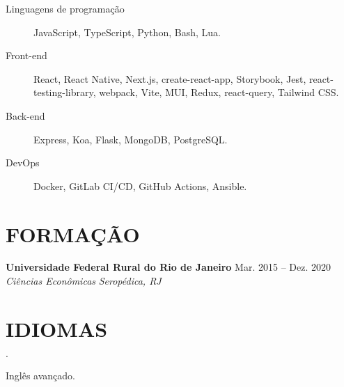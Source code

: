 \documentclass[12pt]{article}
\newenvironment{tightlist}
  {\begin{list}
    {$\cdot$}
    {
      \setlength{\leftmargin}{0em}
      \setlength{\itemsep}{\smallskipamount}
    }
  }
{\end{list}}
\begin{document}
\begin{description}
  \item[Linguagens de programação] JavaScript, TypeScript, Python, Bash, Lua.
  \item[Front-end] React, React Native, Next.js, create-react-app,
    Storybook, Jest, react-testing-library, webpack, Vite,
    MUI, Redux, react-query, Tailwind CSS.
  \item[Back-end] Express, Koa, Flask, MongoDB, PostgreSQL.
  \item[DevOps] Docker, GitLab CI/CD, GitHub Actions, Ansible.
\end{description}

\section*{FORMAÇÃO}

\textbf{Universidade Federal Rural do Rio de Janeiro} \hfill {Mar. 2015 -- Dez. 2020} \\
\textit{Ciências Econômicas} \hfill \textit{Seropédica, RJ} {\parfillskip=0pt\par}

\section*{IDIOMAS}

\begin{tightlist}
  \item Inglês avançado.
\end{tightlist}
\end{document}
